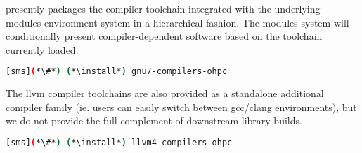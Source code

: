 \OHPC{} presently packages the \GNU{} compiler toolchain integrated with the 
underlying modules-environment system in a hierarchical fashion. The modules
system will conditionally present compiler-dependent software based on the
toolchain currently loaded. 

\begin{lstlisting}[language=bash]
[sms](*\#*) (*\install*) gnu7-compilers-ohpc
\end{lstlisting}

The llvm compiler toolchains are also provided as a standalone additional
compiler family (ie. users can easily switch between gcc/clang environments),
but we do not provide the full complement of downstream library builds.

\begin{lstlisting}[language=bash]
[sms](*\#*) (*\install*) llvm4-compilers-ohpc
\end{lstlisting}
